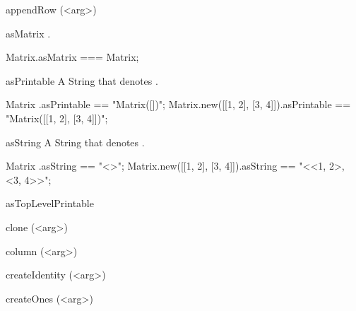 \begin{urbiscriptapi}
\item[appendRow](<arg>)%
\begin{urbiassert}

\end{urbiassert}

\item[asMatrix]%
  \this.
\begin{urbiassert}
Matrix.asMatrix === Matrix;
\end{urbiassert}

\item[asPrintable]%
  A String that denotes \this.
\begin{urbiassert}
Matrix                      .asPrintable == "Matrix([])";
Matrix.new([[1, 2], [3, 4]]).asPrintable == "Matrix([[1, 2], [3, 4]])";
\end{urbiassert}

\item[asString]%
  A String that denotes \this.
\begin{urbiassert}
Matrix                      .asString == "<>";
Matrix.new([[1, 2], [3, 4]]).asString == "<<1, 2>, <3, 4>>";
\end{urbiassert}

\item[asTopLevelPrintable]%
\begin{urbiassert}

\end{urbiassert}

\item[clone](<arg>)%
\begin{urbiassert}

\end{urbiassert}

\item[column](<arg>)%
\begin{urbiassert}

\end{urbiassert}

\item[createIdentity](<arg>)%
\begin{urbiassert}

\end{urbiassert}

\item[createOnes](<arg>)%
\begin{urbiassert}

\end{urbiassert}


\end{urbiscriptapi}
